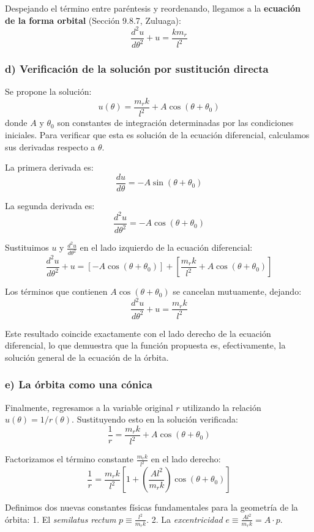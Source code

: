 \documentclass[a4paper]{article}
\begin{document}
Despejando el término entre paréntesis y reordenando, llegamos a la \textbf{ecuación de la forma orbital} (Sección 9.8.7, Zuluaga):
$$\frac{d^2u}{d\theta^2} + u = \frac{k m_r}{l^2}$$

\subsubsection*{d) Verificación de la solución por sustitución directa}

Se propone la solución:
$$u(\theta) = \frac{m_r k}{l^2} + A\cos(\theta + \theta_0)$$
donde $A$ y $\theta_0$ son constantes de integración determinadas por las condiciones iniciales. Para verificar que esta es solución de la ecuación diferencial, calculamos sus derivadas respecto a $\theta$.

La primera derivada es:
$$\frac{du}{d\theta} = -A\sin(\theta + \theta_0)$$

La segunda derivada es:
$$\frac{d^2u}{d\theta^2} = -A\cos(\theta + \theta_0)$$

Sustituimos $u$ y $\frac{d^2u}{d\theta^2}$ en el lado izquierdo de la ecuación diferencial:
$$\frac{d^2u}{d\theta^2} + u = \left[ -A\cos(\theta + \theta_0) \right] + \left[ \frac{m_r k}{l^2} + A\cos(\theta + \theta_0) \right]$$

Los términos que contienen $A\cos(\theta + \theta_0)$ se cancelan mutuamente, dejando:
$$\frac{d^2u}{d\theta^2} + u = \frac{m_r k}{l^2}$$

Este resultado coincide exactamente con el lado derecho de la ecuación diferencial, lo que demuestra que la función propuesta es, efectivamente, la solución general de la ecuación de la órbita.

\subsubsection*{e) La órbita como una cónica}

Finalmente, regresamos a la variable original $r$ utilizando la relación $u(\theta) = 1/r(\theta)$. Sustituyendo esto en la solución verificada:
$$\frac{1}{r} = \frac{m_r k}{l^2} + A\cos(\theta + \theta_0)$$

Factorizamos el término constante $\frac{m_r k}{l^2}$ en el lado derecho:
$$\frac{1}{r} = \frac{m_r k}{l^2} \left[ 1 + \left( \frac{A l^2}{m_r k} \right) \cos(\theta + \theta_0) \right]$$

Definimos dos nuevas constantes físicas fundamentales para la geometría de la órbita:
1. El \textit{semilatus rectum} $p \equiv \frac{l^2}{m_r k}$.
2. La \textit{excentricidad} $e \equiv \frac{A l^2}{m_r k} = A \cdot p$.
\end{document}
